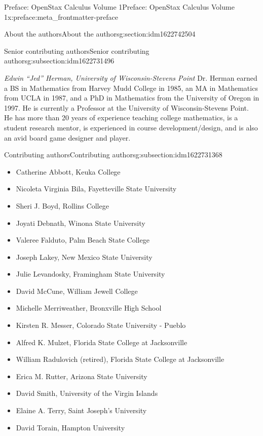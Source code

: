 \documentclass[oneside,10pt,]{book}
\numberwithin{equation}{section}
\begin{document}
\begin{preface}{Preface: OpenStax Calculus Volume 1}{}{Preface: OpenStax Calculus Volume 1}{}{}{x:preface:meta_frontmatter-preface}
\begin{sectionptx}{About the authors}{}{About the authors}{}{}{g:section:idm1622742504}
\begin{subsectionptx}{Senior contributing authors}{}{Senior contributing authors}{}{}{g:subsection:idm1622731496}
\par
\emph{Edwin “Jed” Herman, University of Wisconsin-Stevens Point} Dr. Herman earned a BS in Mathematics from Harvey Mudd College in 1985, an MA in Mathematics from UCLA in 1987, and a PhD in Mathematics from the University of Oregon in 1997. He is currently a Professor at the University of Wisconsin-Stevens Point. He has more than 20 years of experience teaching college mathematics, is a student research mentor, is experienced in course development\slash{}design, and is also an avid board game designer and player.%
\end{subsectionptx}
%
%
\typeout{************************************************}
\typeout{************************************************}
%
\begin{subsectionptx}{Contributing authors}{}{Contributing authors}{}{}{g:subsection:idm1622731368}
%
\begin{itemize}[label=\textbullet]
\item{}Catherine Abbott, Keuka College%
\item{}Nicoleta Virginia Bila, Fayetteville State University%
\item{}Sheri J. Boyd, Rollins College%
\item{}Joyati Debnath, Winona State University%
\item{}Valeree Falduto, Palm Beach State College%
\item{}Joseph Lakey, New Mexico State University%
\item{}Julie Levandosky, Framingham State University%
\item{}David McCune, William Jewell College%
\item{}Michelle Merriweather, Bronxville High School%
\item{}Kirsten R. Messer, Colorado State University - Pueblo%
\item{}Alfred K. Mulzet, Florida State College at Jacksonville%
\item{}William Radulovich (retired), Florida State College at Jacksonville%
\item{}Erica M. Rutter, Arizona State University%
\item{}David Smith, University of the Virgin Islands%
\item{}Elaine A. Terry, Saint Joseph’s University%
\item{}David Torain, Hampton University%
\end{itemize}
%
\end{subsectionptx}

\end{sectionptx}
\end{preface}
\end{document}
